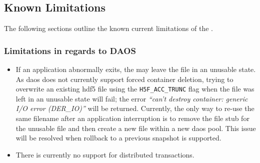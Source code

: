 \documentclass[../users_guide.tex]{subfiles}
\begin{document}
\newpage

\subsection{Known Limitations}

The following sections outline the known current limitations of the \dvc{}.

\subsubsection{Limitations in regards to DAOS}

\begin{itemize}
 \item If an application abnormally exits, the \dvc{} may leave the file in an unusable state. As \acrshort{daos} does not currently support forced container deletion, trying to overwrite an existing \acrshort{hdf5} file using the \texttt{H5F\_ACC\_TRUNC} flag when the file was left in an unusable state will fail; the error \textit{``can't destroy container: generic I/O error (DER\_IO)''} will be returned. Currently, the only way to re-use the same filename after an application interruption is to remove the file stub for the unusable file and then create a new file within a new \acrshort{daos} pool. This issue will be resolved when rollback to a previous snapshot is supported.
\item There is currently no support for distributed transactions.
\end{itemize}
\end{document}
